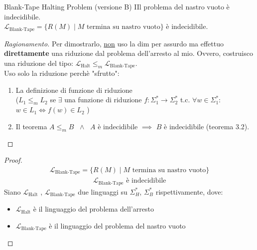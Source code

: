 \documentclass{article}  %
\theoremstyle{definition}
\newenvironment{ragionamento}[1][]
  {\begin{proof}[Ragionamento#1]\renewcommand{\qedsymbol}{}\normalfont}
  {\end{proof}}
\begin{document}
\begin{theorem}{Blank-Tape Halting Problem (versione B)}
IIl problema del nastro vuoto è indecidibile. \\
$\mathcal{L}_{\text{Blank-Tape}} = \{R(M) \mid M \text{ termina su nastro vuoto}\}$ è indecidibile.
\footnotesize %
  \begin{ragionamento}
    Per dimostrarlo, \underline{non} uso la dim per assurdo ma effettuo \textbf{direttamente} una riduzione dal problema dell'arresto al mio. Ovvero, 
    costruisco una riduzione del tipo: $\mathcal{L}_{\text{Halt}} \leq_m \mathcal{L}_{\text{Blank-Tape}}$. \\
    Uso solo la riduzione perchè "sfrutto":
    \begin{enumerate}
      \item La definizione di funzione di riduzione\\
      ($L_1 \leq_m L_2$ se $\exists$ una funzione di riduzione $f: \Sigma_1^* \rightarrow \Sigma_2^*$ t.c. $\forall{w}\in \Sigma_1^*$: \\
      $w \in L_1 \iff f(w) \in L_2$
      )
      \item Il teorema $A \leq_m B$ $\;\wedge\;$ $A$ è indecidibile $\implies$ $B$ è indecidibile (teorema 3.2).
    \end{enumerate}
  \end{ragionamento}
  \begin{proof}
        \begin{align*}
      \mathcal{L}_{\text{Blank-Tape}} = \{R(M) \mid M \text{ termina su nastro vuoto}\} \tag*{(ipotesi)}
    \end{align*}
    \begin{align*}
      \mathcal{L}_{\text{Blank-Tape}} \text{ è indecidibile} \tag*{(tesi)}
    \end{align*}
    Siano $\mathcal{L}_{\text{Halt}}$ , $\mathcal{L}_{\text{Blank-Tape}}$ due linguaggi su $\Sigma_H^*$, $\Sigma_B^*$ rispettivamente, dove:
    \begin{itemize}
      \item $\mathcal{L}_{\text{Halt}}$ è il linguaggio del problema dell'arresto
      \item $\mathcal{L}_{\text{Blank-Tape}}$ è il linguaggio del problema del nastro vuoto
    \end{itemize}
    

\end{proof}
\end{theorem}
\end{document}
